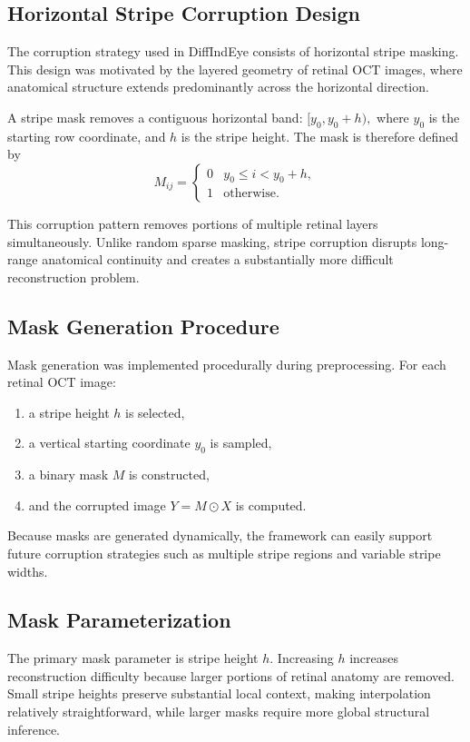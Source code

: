 \documentclass[12pt,oneside]{article}
\begin{document}
\subsection*{Horizontal Stripe Corruption Design}

The corruption strategy used in DiffIndEye consists of horizontal stripe masking. This design was motivated by the layered geometry of retinal OCT images, where anatomical structure extends predominantly across the horizontal direction.

A stripe mask removes a contiguous horizontal band:
\(
[y_0,y_0+h),
\)
where $y_0$ is the starting row coordinate, and $h$ is the stripe height.
The mask is therefore defined by
\[
M_{ij}
=
\begin{cases}
0 & y_0 \le i < y_0+h,\\
1 & \text{otherwise}.
\end{cases}
\]

This corruption pattern removes portions of multiple retinal layers simultaneously. Unlike random sparse masking, stripe corruption disrupts long-range anatomical continuity and creates a substantially more difficult reconstruction problem.

\subsection{Mask Generation Procedure}

Mask generation was implemented procedurally during preprocessing. For each retinal OCT image:
\begin{enumerate}
    \item a stripe height $h$ is selected,
    \item a vertical starting coordinate $y_0$ is sampled,
    \item a binary mask $M$ is constructed,
    \item and the corrupted image
    \(
    Y=M\odot X
    \)
    is computed.
\end{enumerate}

Because masks are generated dynamically, the framework can easily support future corruption strategies such as multiple stripe regions and variable stripe widths.

\subsection*{Mask Parameterization}

The primary mask parameter is stripe height $h$.
Increasing $h$ increases reconstruction difficulty because larger portions of retinal anatomy are removed. Small stripe heights preserve substantial local context, making interpolation relatively straightforward, while larger masks require more global structural inference.
\end{document}
